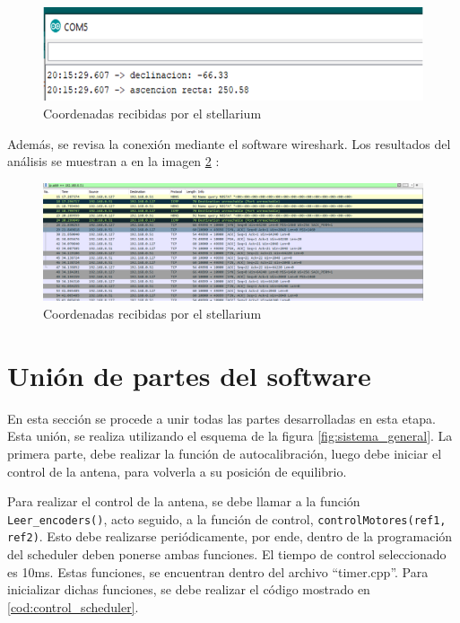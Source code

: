 \begin{figure}[ht!]
	\includegraphics{puerto_comm_stellarium}
	\caption{Coordenadas recibidas por el stellarium}
	\label{fig:coord_test_stell}
\end{figure}


Además, se revisa la conexión mediante el software wireshark. Los resultados del análisis se muestran a en la imagen 	\ref{fig:wireshark_stell} : 



\begin{figure}[ht!]
	\includegraphics[width=\linewidth]{wireshark_stellarium}
	\caption{Coordenadas recibidas por el stellarium}
	\label{fig:wireshark_stell}
\end{figure}

\section{Unión de partes del software} 

En esta sección se procede a unir todas las partes desarrolladas en esta etapa. Esta unión, se realiza utilizando el esquema de la figura \ref{fig:sistema_general}. La primera parte, debe realizar la función de autocalibración, luego debe iniciar el control de la antena, para volverla a su posición de equilibrio.  

Para realizar el control de la antena, se debe llamar a la función \texttt{Leer_encoders()}, acto seguido, a la función de control, \texttt{controlMotores(ref1, ref2)}. Esto debe realizarse periódicamente, por ende, dentro de la programación del scheduler deben ponerse ambas funciones. El tiempo de control seleccionado es 10ms. Estas funciones, se encuentran dentro del archivo ``timer.cpp''. Para inicializar dichas funciones, se debe realizar el código mostrado en \ref{cod:control_scheduler}. 

